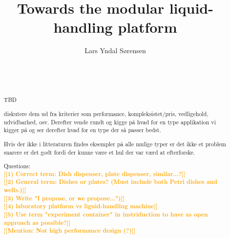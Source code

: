 \documentclass{sigchi}
\newcommand{\todo}[1]{\textsf{\textbf{\textcolor{Orange}{[[#1]]}}}}
\begin{document}
	
	\title{Towards the modular liquid-handling platform}
	
	\author{
		\alignauthor Lars Yndal Sørensen\\
		\\
		\\
		\\
	}
	
	\maketitle
	
	\begin{abstract}
		TBD
		
		diskutere dem ud 
		fra kriterier som performance, kompleksistet/pris, vedligehold, udvidbarhed,
		osv. Derefter vende rundt og kigge på hvad for en type applikation vi kigger på og ser derefter hvad for en type der så passer bedst.
		
		Hvis der ikke i litteraturen findes eksempler på alle mulige typer er det
		ikke et problem snarere er det godt fordi der kunne være et hul der
		var værd at efterforske.
		
		Questions:\\
			\todo{1) Correct term: Dish dispenser, plate dispenser, similar...?}\\
			\todo{2) General term: Dishes or plates? (Must include both Petri dishes and wells.)}\\
			\todo{3) Write "I propose, or we propose...")}\\
			\todo{4) laboratory platform vs liguid-handling machine}\\
			\todo{5) Use term "experiment container" in instriduction to have as open approach as possible?}\\
			\todo{Mention: Not high performance design (?)}
			
	\end{abstract}
	
	
	
\end{document}
